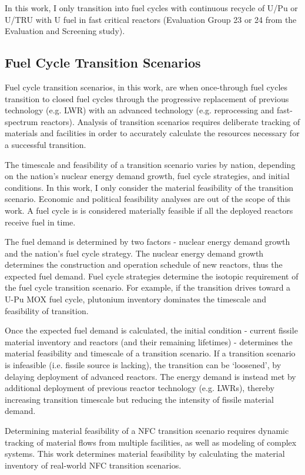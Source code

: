 In this work, I only transition into fuel cycles with
continuous recycle of U/Pu or U/TRU with U fuel in fast critical reactors
(Evaluation Group 23 or 24 from the Evaluation and Screening study\cite{wigeland_nuclear_2014}).

\subsection{Fuel Cycle Transition Scenarios}
Fuel cycle transition scenarios, in this work, are when
once-through fuel cycles transition to closed fuel
cycles through the progressive replacement of previous technology
(e.g. \gls{LWR}) with an advanced technology (e.g. reprocessing
and fast-spectrum reactors). Analysis of transition scenarios requires
deliberate tracking of materials and facilities in order
to accurately calculate the resources necessary for a
successful transition.

The timescale and feasibility of a transition scenario
varies by nation, depending on the nation's nuclear energy demand
growth, fuel cycle strategies, and initial conditions.
In this work, I only consider the material feasibility of the
transition scenario. Economic and political feasibility analyses
are out of the scope of this work. A fuel cycle is is considered
materially feasible if all the deployed reactors receive fuel
in time.

The fuel demand is determined by two factors - nuclear energy demand
growth and the nation's fuel cycle strategy.
The nuclear energy demand growth determines the construction
and operation
schedule of new reactors, thus the expected fuel demand.
Fuel cycle strategies determine the isotopic
requirement of the fuel cycle transition scenario. For example,
if the transition drives toward a U-Pu \gls{MOX} fuel cycle,
plutonium inventory dominates the timescale and feasibility of transition.

Once the expected fuel demand is calculated,
the initial condition - current fissile material inventory
and reactors (and their remaining lifetimes) - determines
the material feasibility and timescale of a transition scenario.
If a transition scenario is infeasible (i.e. fissile source is lacking),
the transition can be `loosened', by delaying deployment
of advanced reactors. The energy demand is instead met by additional
deployment of previous reactor technology (e.g. \glspl{LWR}),
thereby increasing transition timescale but reducing the
intensity of fissile material demand.

Determining material feasibility of a \gls{NFC} transition scenario
requires dynamic tracking of material flows from multiple facilities,
as well as modeling of complex systems. This work
determines material feasibility by calculating
the material inventory of real-world \gls{NFC} transition scenarios.


